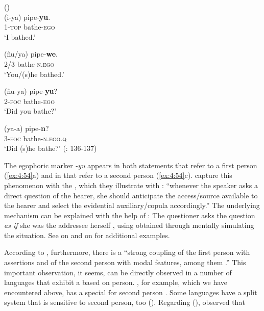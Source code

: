 \ea%
    \label{ex:4:54}
     ()\\
    \ea
    \gll (i-ya)    pipe-\textbf{{yu}}.\\
    1-\textsc{top}    bathe-\textsc{ego}\\
    \glt ‘I bathed.’

    \ex
    \gll (ñu/ya)    pipe-\textbf{{we}}.\\
    2/3    bathe-\textsc{n.ego}\\
    \glt ‘You/(s)he bathed.’

    \ex
    \gll (ñu-ya)    pipe-\textbf{{yu}}?\\
    2-\textsc{foc}    bathe-\textsc{ego}\\
    \glt ‘Did you bathe?’

    \ex
    \gll (ya-a)    pipe-\textbf{{n}}?\\
    3-\textsc{foc}    bathe-\textsc{n.ego.q}\\
    \glt ‘Did (s)he bathe?’ (\citealt{SanRoqueFloydNorcliffe2016}: 136-137)
    \z
    \z 

\noindent The egophoric marker \textit{-yu} appears in both statements that refer to a first person (\ref{ex:4:54}a) and in  that refer to a second person (\ref{ex:4:54}c). \citet[245]{TournadreLaPolla2014} capture this phenomenon with the \textit{}, which they illustrate with : “whenever the speaker asks a direct question of the hearer, she should anticipate the access/source available to the hearer and select the evidential auxiliary/copula accordingly.” The underlying mechanism can be explained with the help of : The questioner asks the question \textit{as if} she was the addressee herself \citep[527]{Gallese2009}, using  obtained through mentally simulating the situation. See  on  and  on  for additional examples.

According to \citet[248]{Schulze2007}, furthermore, there is a “strong coupling of the first person with assertions and of the second person with modal features, among them .” This important observation, it seems, can be directly observed in a number of languages that exhibit a  based on person. , for example, which we have encountered above, has a special  for second person . Some  languages have a split system that is sensitive to second person, too (). Regarding  (), \citet[199]{Sadock1984} observed that

